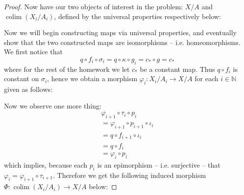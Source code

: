 \documentclass{article}
\newcommand{\N}{\mathbb{N}}
\DeclareMathOperator{\colim}{colim}
\begin{document}
\begin{proof}
    
    Now have our two objects of interest in the problem: $X/A$ and $\colim (X_i/A_i)$, defined by the universal properties respectively below:
    \begin{center}
    \end{center}
    \begin{center}
    \end{center}
    Now we will begin constructing maps via universal properties, and eventually show that the two constructed maps are isomorphisms -- i.e. homeomorphisms. We first notice that 
    \[
    q\circ f_i \circ \sigma_i=q\circ \kappa \circ g_i=c_*\circ g=c_*
    \]
    where for the rest of the homework we let $c_*$ be a constant map. Thus $q\circ f_i$ is constant on $\sigma_i$, hence we obtain a morphism $\varphi_i:X_i/A_i \to X/A$ for each $i\in \N$ given as follows:
    \begin{center}
    \end{center}
    Now we observe one more thing:
    \begin{align*}
        \varphi_{i+1}\circ \tau_i\circ p_i\\
        =\varphi_{i+1}\circ p_{i+1}\circ \iota_i\\
        =q\circ f_{i+1}\circ \iota_i\\
        =q\circ f_i\\
        =\varphi_i\circ p_i
    \end{align*}
    which implies, because each $p_i$ is an epimorphism -- i.e. surjective -- that $\varphi_i=\varphi_{i+1}\circ \tau_{i+1}$. Therefore we get the following induced morphism $\Phi:\colim (X_i/A_i)\to X/A$ below:

\end{proof}
\end{document}

